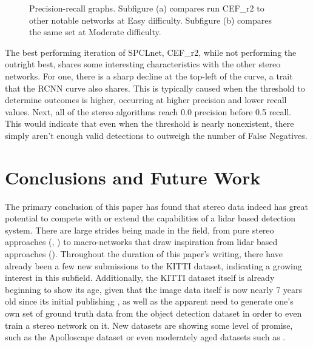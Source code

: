 \begin{figure}[H]
	\centering
	\caption{Precision-recall graphs. Subfigure (a) compares run CEF\_r2 to other notable networks at Easy  difficulty. Subfigure (b) compares the same set at Moderate difficulty.}
	\label{fpnet_pr4}
\end{figure}

The best performing iteration of SPCLnet, CEF\_r2, while not performing the outright best, shares some interesting characteristics with the other stereo networks. For one, there is a sharp decline at the top-left of the curve, a trait that the RCNN curve also shares. This is typically caused when the threshold to determine outcomes is higher, occurring at higher precision and lower recall values. Next, all of the stereo algorithms reach 0.0 precision before 0.5 recall. This would indicate that even when the threshold is nearly nonexistent, there simply aren't enough valid detections to outweigh the number of False Negatives. 

\newpage
\section{Conclusions and Future Work}
\label{sect_conclusions}

The primary conclusion of this paper has found that stereo data indeed has great potential to compete with or extend the capabilities of a lidar based detection system. There are large strides being made in the field, from pure stereo approaches (\cite{zeng2018rt3d}, \cite{li_stereo_2019}) to macro-networks that draw inspiration from lidar based approaches (\cite{wang_pseudo-lidar_2019}). Throughout the duration of this paper's writing, there have already been a few new submissions to the KITTI dataset, indicating a growing interest in this subfield. Additionally, the KITTI dataset itself is already beginning to show its age, given that the image data itself is now nearly 7 years old since its initial publishing \cite{geiger_are_2012}, as well as the apparent need to generate one's own set of ground truth data from the object detection dataset in order to even train a stereo network on it. New datasets are showing some level of promise, such as the Apolloscape dataset \cite{huang_apolloscape_2018} or even moderately aged datasets such as \cite{cordts_cityscapes_2016}.

